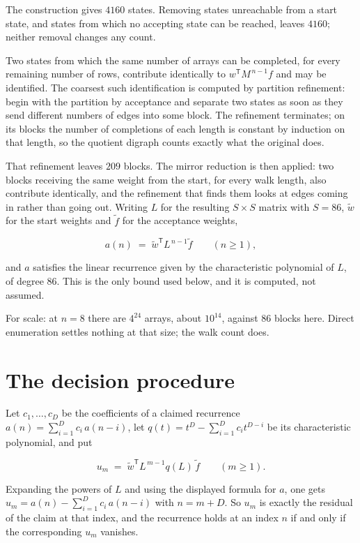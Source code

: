 \documentclass[11pt]{article}
\theoremstyle{definition}
\begin{document}
The construction gives $4160$ states. Removing states unreachable from a start state, and states from which no accepting state can be reached, leaves $4160$; neither removal changes any count.

Two states from which the same number of arrays can be completed, for every remaining number of rows, contribute identically to $w^{\mathsf T}M^{\,n-1}f$ and may be identified. The coarsest such identification is computed by partition refinement: begin with the partition by acceptance and separate two states as soon as they send different numbers of edges into some block. The refinement terminates; on its blocks the number of completions of each length is constant by induction on that length, so the quotient digraph counts exactly what the original does.

That refinement leaves $209$ blocks. The mirror reduction is then applied: two blocks receiving the same weight from the start, for every walk length, also contribute identically, and the refinement that finds them looks at edges coming in rather than going out. Writing $L$ for the resulting $S \times S$ matrix with $S = 86$, $\tilde w$ for the start weights and $\tilde f$ for the acceptance weights,

\[a(n) \;=\; \tilde w^{\mathsf T} L^{\,n-1} \tilde f \qquad (n \ge 1),\]

and $a$ satisfies the linear recurrence given by the characteristic polynomial of $L$, of degree $86$. This is the only bound used below, and it is computed, not assumed.

For scale: at $n = 8$ there are $4^{24}$ arrays, about $10^{14}$, against $86$ blocks here. Direct enumeration settles nothing at that size; the walk count does.

\section{The decision procedure}

Let $c_1,\dots,c_D$ be the coefficients of a claimed recurrence $a(n) = \sum_{i=1}^{D} c_i\,a(n-i)$, let $q(t) = t^{D} - \sum_{i=1}^{D} c_i t^{D-i}$ be its characteristic polynomial, and put

\[u_m \;=\; \tilde w^{\mathsf T} L^{\,m-1} q(L)\,\tilde f \qquad (m \ge 1).\]

Expanding the powers of $L$ and using the displayed formula for $a$, one gets $u_m = a(n) - \sum_{i=1}^{D} c_i\,a(n-i)$ with $n = m + D$. So $u_m$ is exactly the residual of the claim at that index, and the recurrence holds at an index $n$ if and only if the corresponding $u_m$ vanishes.
\end{document}
